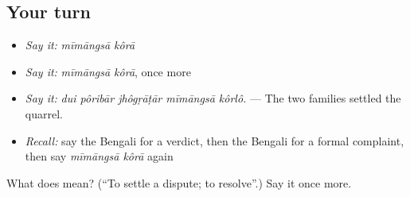 \subsection*{Your turn}
\begin{itemize}
\raggedright
  \item \emph{Say it:} \emph{mīmāngsā kôrā}
  \item \emph{Say it:} \emph{mīmāngsā kôrā}, once more
  \item \emph{Say it:} \emph{dui pôribār jhôgṛāṭār mīmāngsā kôrlô.} — The two families settled the quarrel.
  \item \emph{Recall:} say the Bengali for a verdict, then the Bengali for a formal complaint, then say \emph{mīmāngsā kôrā} again
\end{itemize}

\begin{tcolorbox}[breakable,colback=teal!4,colframe=teal!35!black,title={Before you move on}]
What does   mean? (\textquotedblleft{}To settle a dispute; to resolve\textquotedblright{}.) Say it once more.
\end{tcolorbox}
